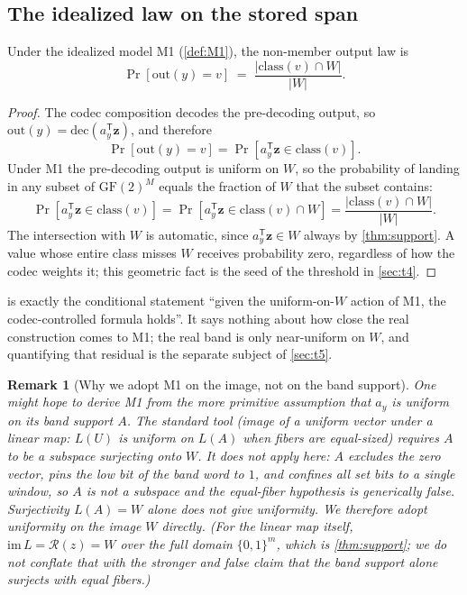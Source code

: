 \documentclass[sigconf,nonacm,anonymous,balance=false]{acmart}
\newtheorem{remark}{Remark}
\newcommand{\dec}{\mathrm{dec}}
\newcommand{\B}{\{0,1\}}
\newcommand{\GF}{\mathrm{GF}(2)}
\newcommand{\class}{\mathrm{class}}
\newcommand{\W}{W}                          %
\newcommand{\Rz}{\mathcal{R}(z)}            %
\newcommand{\bz}{\mathbf{z}}                %
\newcommand{\ay}{a_y}                       %
\newcommand{\inter}{\cap}
\begin{document}
\subsection{The idealized law on the stored span}

\begin{theorem}
\label{thm:idealized}
Under the idealized model M1 (\cref{def:M1}), the non-member output law is
\begin{equation}
  \Pr[\mathrm{out}(y) = v] \;=\; \frac{|\class(v) \inter \W|}{|\W|}.
  \label{eq:idealized}
\end{equation}
\end{theorem}

\begin{proof}
The codec composition decodes the pre-decoding output, so
$\mathrm{out}(y) = \dec(\ay^{\mathsf T}\bz)$, and therefore
\[
  \Pr[\mathrm{out}(y) = v] = \Pr[\ay^{\mathsf T}\bz \in \class(v)].
\]
Under M1 the pre-decoding output is uniform on $\W$, so the probability of landing in
any subset of $\GF^M$ equals the fraction of $\W$ that the subset contains:
\[
  \Pr[\ay^{\mathsf T}\bz \in \class(v)]
  = \Pr[\ay^{\mathsf T}\bz \in \class(v) \inter \W]
  = \frac{|\class(v) \inter \W|}{|\W|}.
\]
The intersection with $\W$ is automatic, since $\ay^{\mathsf T}\bz \in \W$ always by
\cref{thm:support}. A value whose entire class misses $\W$ receives probability zero,
regardless of how the codec weights it; this geometric fact is the seed of the
threshold in \cref{sec:t4}.
\end{proof}

 is exactly the conditional statement ``given the uniform-on-$\W$
action of M1, the codec-controlled formula holds''. It says nothing about how close
the real construction comes to M1; the real band is only near-uniform on $\W$, and
quantifying that residual is the separate subject of \cref{sec:t5}.

\begin{remark}[Why we adopt M1 on the image, not on the band support]
One might hope to derive M1 from the more primitive assumption that $\ay$ is uniform
on its band support $A$. The standard tool (image of a uniform vector under a linear
map: $L(U)$ is uniform on $L(A)$ when fibers are equal-sized) requires $A$ to be a
subspace surjecting onto $\W$. It does not apply here: $A$ excludes the zero vector,
pins the low bit of the band word to $1$, and confines all set bits to a single
window, so $A$ is not a subspace and the equal-fiber hypothesis is generically false.
Surjectivity $L(A) = \W$ alone does not give uniformity. We therefore adopt uniformity
on the image $\W$ directly. (For the linear map itself, $\mathrm{im}\, L = \Rz = \W$
over the \emph{full} domain $\B^m$, which is \cref{thm:support}; we do not conflate
that with the stronger and false claim that the band support alone surjects with equal
fibers.)
\end{remark}
\end{document}
